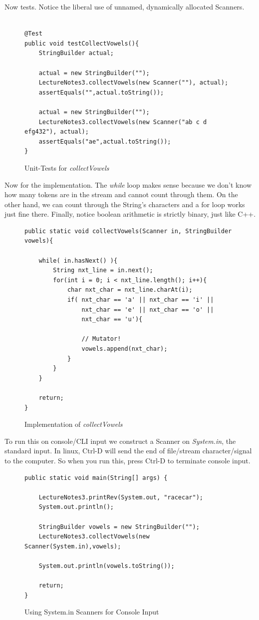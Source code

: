 \documentclass[]{tufte-handout}
\begin{document}
Now tests. Notice the liberal use of unnamed, dynamically allocated Scanners. 

\begin{figure}
\begin{lstlisting}

@Test
public void testCollectVowels(){
	StringBuilder actual;
	
	actual = new StringBuilder("");		
	LectureNotes3.collectVowels(new Scanner(""), actual);
	assertEquals("",actual.toString());
	
	actual = new StringBuilder("");		
	LectureNotes3.collectVowels(new Scanner("ab c d efg432"), actual);
	assertEquals("ae",actual.toString());
}

\end{lstlisting}
\label{fig:vowelstests}
\caption{Unit-Tests for \textit{collectVowels}}
\end{figure}

Now for the implementation. The \textit{while} loop makes sense because we don't know how many tokens are in the stream and cannot count through them. On the other hand, we can count through the String's characters and a for loop works just fine there. Finally, notice boolean arithmetic is strictly binary, just like C++. 

\begin{figure}
\begin{lstlisting}
public static void collectVowels(Scanner in, StringBuilder vowels){
		
	while( in.hasNext() ){
		String nxt_line = in.next();
		for(int i = 0; i < nxt_line.length(); i++){
			char nxt_char = nxt_line.charAt(i);
			if( nxt_char == 'a' || nxt_char == 'i' || 
				nxt_char == 'e' || nxt_char == 'o' ||
				nxt_char == 'u'){

				// Mutator!				
				vowels.append(nxt_char);				
			}
		}
	}
	
	return;
}
\end{lstlisting}
\label{fig:vowelsimpl}
\caption{Implementation of \textit{collectVowels}}
\end{figure}

To run this on console/CLI input we construct a Scanner on \textit{System.in}, the standard input. In linux, Ctrl-D will send the end of file/stream character/signal to the computer. So when you run this, press Ctrl-D to terminate console input. 

\begin{figure}
\begin{lstlisting}
public static void main(String[] args) {
		
	LectureNotes3.printRev(System.out, "racecar");
	System.out.println();
	
	StringBuilder vowels = new StringBuilder("");
	LectureNotes3.collectVowels(new Scanner(System.in),vowels);
		
	System.out.println(vowels.toString());
	
	return;
}
\end{lstlisting}

\label{fig:cliInput}
\caption{Using System.in Scanners for Console Input}
\end{figure}
\end{document}
